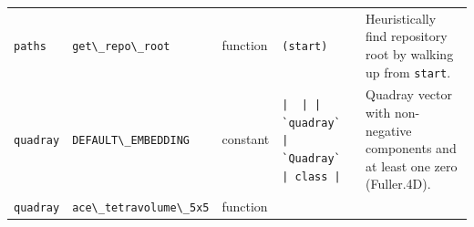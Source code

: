 \documentclass[
  10pt,
]{article}
\newcommand{\passthrough}[1]{#1}
\begin{document}
\begin{longtable}[]{@{}lllll@{}}
\begin{minipage}[t]{0.17\columnwidth}\raggedright
\passthrough{\lstinline!paths!}\strut
\end{minipage} & \begin{minipage}[t]{0.17\columnwidth}\raggedright
\passthrough{\lstinline!get\_repo\_root!}\strut
\end{minipage} & \begin{minipage}[t]{0.17\columnwidth}\raggedright
function\strut
\end{minipage} & \begin{minipage}[t]{0.17\columnwidth}\raggedright
\passthrough{\lstinline!(start)!}\strut
\end{minipage} & \begin{minipage}[t]{0.17\columnwidth}\raggedright
Heuristically find repository root by walking up from
\passthrough{\lstinline!start!}.\strut
\end{minipage}\tabularnewline
\begin{minipage}[t]{0.17\columnwidth}\raggedright
\passthrough{\lstinline!quadray!}\strut
\end{minipage} & \begin{minipage}[t]{0.17\columnwidth}\raggedright
\passthrough{\lstinline!DEFAULT\_EMBEDDING!}\strut
\end{minipage} & \begin{minipage}[t]{0.17\columnwidth}\raggedright
constant\strut
\end{minipage} & \begin{minipage}[t]{0.17\columnwidth}\raggedright
\passthrough{\lstinline!|  | | `quadray` | `Quadray` | class |!}\strut
\end{minipage} & \begin{minipage}[t]{0.17\columnwidth}\raggedright
Quadray vector with non-negative components and at least one zero
(Fuller.4D).\strut
\end{minipage}\tabularnewline
\begin{minipage}[t]{0.17\columnwidth}\raggedright
\passthrough{\lstinline!quadray!}\strut
\end{minipage} & \begin{minipage}[t]{0.17\columnwidth}\raggedright
\passthrough{\lstinline!ace\_tetravolume\_5x5!}\strut
\end{minipage} & \begin{minipage}[t]{0.17\columnwidth}\raggedright
function\strut
\end{minipage} & \begin{minipage}[t]{0.17\columnwidth}\raggedright

\end{minipage}
\end{longtable}
\end{document}
